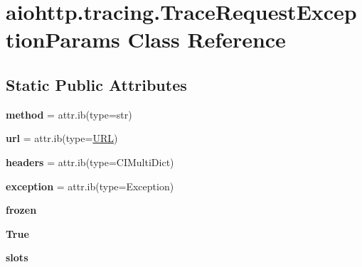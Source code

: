 \hypertarget{classaiohttp_1_1tracing_1_1_trace_request_exception_params}{}\section{aiohttp.\+tracing.\+Trace\+Request\+Exception\+Params Class Reference}
\label{classaiohttp_1_1tracing_1_1_trace_request_exception_params}
\subsection*{Static Public Attributes}
\begin{DoxyCompactItemize}
\item 
\mbox{\label{classaiohttp_1_1tracing_1_1_trace_request_exception_params_aa7a4548d7819c1bd8e511172ee987af7}} 
{\bfseries method} = attr.\+ib(type=str)
\item 
\mbox{\label{classaiohttp_1_1tracing_1_1_trace_request_exception_params_a95794a543a59de9a0a6be21613e1cea5}} 
{\bfseries url} = attr.\+ib(type=\hyperlink{classyarl_1_1_u_r_l}{U\+RL})
\item 
\mbox{\label{classaiohttp_1_1tracing_1_1_trace_request_exception_params_a04cd4af80dd64ce8d22dd8dc1c8cee18}} 
{\bfseries headers} = attr.\+ib(type=C\+I\+Multi\+Dict)
\item 
\mbox{\label{classaiohttp_1_1tracing_1_1_trace_request_exception_params_ae8a26a40355f26339c74f652d0ba7a57}} 
{\bfseries exception} = attr.\+ib(type=Exception)
\item 
\mbox{\label{classaiohttp_1_1tracing_1_1_trace_request_exception_params_ad679d829f74a95c791c8a2c3e6fd7a24}} 
{\bfseries frozen}
\item 
\mbox{\label{classaiohttp_1_1tracing_1_1_trace_request_exception_params_af04c5961bceeaccb887800e5811db502}} 
{\bfseries True}
\item 
\mbox{\label{classaiohttp_1_1tracing_1_1_trace_request_exception_params_a93f8e8829d422ea4a8394a9a7f620f1d}} 
{\bfseries slots}
\end{DoxyCompactItemize}


